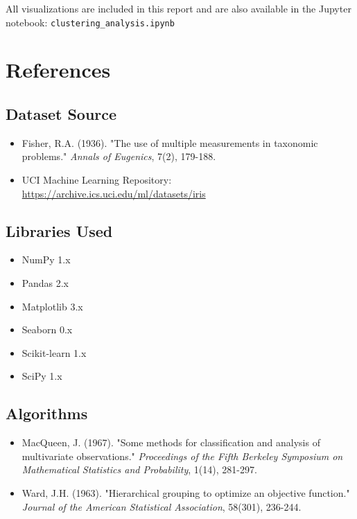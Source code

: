 \documentclass[12pt,a4paper]{article}
\begin{document}
All visualizations are included in this report and are also available in the Jupyter notebook: \texttt{clustering\_analysis.ipynb}

\newpage

\section{References}

\subsection{Dataset Source}
\begin{itemize}
    \item Fisher, R.A. (1936). "The use of multiple measurements in taxonomic problems." \textit{Annals of Eugenics}, 7(2), 179-188.
    \item UCI Machine Learning Repository: \url{https://archive.ics.uci.edu/ml/datasets/iris}
\end{itemize}

\subsection{Libraries Used}
\begin{itemize}
    \item NumPy 1.x
    \item Pandas 2.x
    \item Matplotlib 3.x
    \item Seaborn 0.x
    \item Scikit-learn 1.x
    \item SciPy 1.x
\end{itemize}

\subsection{Algorithms}
\begin{itemize}
    \item MacQueen, J. (1967). "Some methods for classification and analysis of multivariate observations." \textit{Proceedings of the Fifth Berkeley Symposium on Mathematical Statistics and Probability}, 1(14), 281-297.
    \item Ward, J.H. (1963). "Hierarchical grouping to optimize an objective function." \textit{Journal of the American Statistical Association}, 58(301), 236-244.
\end{itemize}
\end{document}
